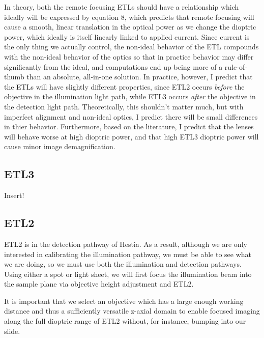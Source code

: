  In theory, both the remote focusing ETLs should have a relationship which ideally will be expressed by equation 8, which predicts  that remote focusing will cause a smooth, linear translation in the optical power as we change the dioptric power, which ideally is itself linearly linked to applied current. Since current is the only thing we actually control, the non-ideal behavior of the ETL compounds with the non-ideal behavior of the optics so that in practice behavior may differ significantly from the ideal, and computations end up being more of a rule-of-thumb than an absolute, all-in-one solution.  In practice, however, I predict that the ETLs will have slightly different properties, since ETL2 occurs \textit{before} the objective in the illumination light path, while ETL3 occurs \textit{after} the objective in the detection light path. Theoretically, this shouldn't matter much, but with imperfect alignment and non-ideal optics, I predict there will be small differences in thier behavior. Furthermore, based on the literature, I predict that the lenses will behave worse at high dioptric power, and that high ETL3 dioptric power will cause minor image demagnification.

\subsection{ETL3}
Insert!
\subsection{ETL2}

ETL2 is in the detection pathway of Hestia. As a result, although we are only interested in calibrating the illumination pathway, we must be able to see what we are doing, so we must use both the illumination and detection pathways. Using either a spot or light sheet, we will first focus the illumination beam into the sample plane via objective height adjustment and ETL2.

It is important that we select an objective which has a large enough working distance and thus a sufficiently versatile z-axial domain to enable focused imaging along the full dioptric range of ETL2 without, for instance, bumping into our slide.

